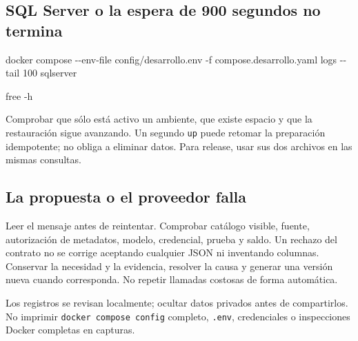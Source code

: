 \documentclass[
  spanish,
  10pt,
  a4paper,
]{article}
\newenvironment{Shaded}{}{}
\newcommand{\AttributeTok}[1]{#1}
\newcommand{\ExtensionTok}[1]{#1}
\newcommand{\FunctionTok}[1]{#1}
\newcommand{\NormalTok}[1]{#1}
\newcommand{\StringTok}[1]{#1}
\newcommand{\VariableTok}[1]{#1}
\renewenvironment{Shaded}{\begin{snugshade}}{\end{snugshade}}%
\begin{document}
\subsection{SQL Server o la espera de 900 segundos no
termina}\label{sql-server-o-la-espera-de-900-segundos-no-termina}

\begin{Shaded}
\begin{Highlighting}[]
\ExtensionTok{docker}\NormalTok{ compose }\AttributeTok{{-}{-}env{-}file}\NormalTok{ config/desarrollo.env }\AttributeTok{{-}f}\NormalTok{ compose.desarrollo.yaml logs }\AttributeTok{{-}{-}tail}\NormalTok{ 100 sqlserver}
\end{Highlighting}
\end{Shaded}

\begin{Shaded}
\begin{Highlighting}[]
\FunctionTok{free} \AttributeTok{{-}h}
\end{Highlighting}
\end{Shaded}

\begin{Shaded}
\end{Shaded}

Comprobar que sólo está activo un ambiente, que existe espacio y que la
restauración sigue avanzando. Un segundo \texttt{up} puede retomar la
preparación idempotente; no obliga a eliminar datos. Para release, usar
sus dos archivos en las mismas consultas.

\subsection{La propuesta o el proveedor
falla}\label{la-propuesta-o-el-proveedor-falla}

Leer el mensaje antes de reintentar. Comprobar catálogo visible, fuente,
autorización de metadatos, modelo, credencial, prueba y saldo. Un
rechazo del contrato no se corrige aceptando cualquier JSON ni
inventando columnas. Conservar la necesidad y la evidencia, resolver la
causa y generar una versión nueva cuando corresponda. No repetir
llamadas costosas de forma automática.

Los registros se revisan localmente; ocultar datos privados antes de
compartirlos. No imprimir \texttt{docker\ compose\ config} completo,
\texttt{.env}, credenciales o inspecciones Docker completas en capturas.
\end{document}
